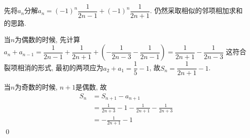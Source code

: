 \begin{jie}
    先将\(a_n\)分解\(a_{n}=(-1)^{n} \dfrac{1}{2 n-1}+(-1)^{n} \dfrac{1}{2 n+1}\).
    仍然采取相似的邻项相加求和的思路. 

    当\(n\)为偶数的时候, 先计算\(a_{n}+a_{n-1}=\dfrac{1}{2 n-1}+\dfrac{1}{2 n+1}+\left(-\dfrac{1}{2 n-3}-\dfrac{1}{2 n-1}\right)=\dfrac{1}{2 n+1}-\dfrac{1}{2 n-3} \)
这符合裂项相消的形式, 最初的两项应为\(a_2+a_1=\dfrac{1}{5}-1\), 故\(S_n=\dfrac{1}{2n+1}-1\).

    当\(n\)为奇数的时候, \(n+1\)是偶数, 故
    \begin{align*}
        S_n&=S_{n+1}-a_{n+1}\\
            &=\frac{1}{2 n+3}-1-\frac{1}{2 n+1}-\frac{1}{2 n+3}\\
            &=-\frac{1}{2 n+1}-1
    \end{align*}   
    \qed
\end{jie}



